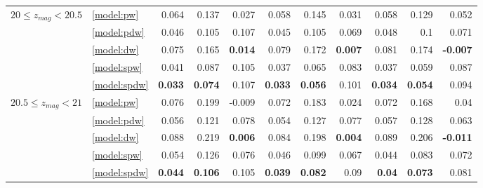 \documentclass[fleqn,usenatbib]{mnras}
\begin{document}
\begin{table}
\begin{tabular}{llrrrrrrrrr}
\hline
            $20 \leq z_{mag} < 20.5$ & \ref{model:pw} &                0.064 &           0.137 &            0.027 &            0.058 &           0.145 &            0.031 &            0.058 &           0.129 &            0.052 \\
                                   & \ref{model:pdw} &                0.046 &           0.105 &            0.107 &            0.045 &           0.105 &            0.069 &            0.048 &             0.1 &            0.071 \\
                                   & \ref{model:dw} &                0.075 &           0.165 &   \textbf{0.014} &            0.079 &           0.172 &   \textbf{0.007} &            0.081 &           0.174 &  \textbf{-0.007} \\
                                   & \ref{model:spw} &                0.041 &           0.087 &            0.105 &            0.037 &           0.065 &            0.083 &            0.037 &           0.059 &            0.087 \\
                                   & \ref{model:spdw} &       \textbf{0.033} &  \textbf{0.074} &            0.107 &   \textbf{0.033} &  \textbf{0.056} &            0.101 &   \textbf{0.034} &  \textbf{0.054} &            0.094 \\
\hline
            $20.5 \leq z_{mag} < 21$ & \ref{model:pw} &                0.076 &           0.199 &           -0.009 &            0.072 &           0.183 &            0.024 &            0.072 &           0.168 &             0.04 \\
                                   & \ref{model:pdw} &                0.056 &           0.121 &            0.078 &            0.054 &           0.127 &            0.077 &            0.057 &           0.128 &            0.063 \\
                                   & \ref{model:dw} &                0.088 &           0.219 &   \textbf{0.006} &            0.084 &           0.198 &   \textbf{0.004} &            0.089 &           0.206 &  \textbf{-0.011} \\
                                   & \ref{model:spw} &                0.054 &           0.126 &            0.076 &            0.046 &           0.099 &            0.067 &            0.044 &           0.083 &            0.072 \\
                                   & \ref{model:spdw} &       \textbf{0.044} &  \textbf{0.106} &            0.105 &   \textbf{0.039} &  \textbf{0.082} &             0.09 &    \textbf{0.04} &  \textbf{0.073} &            0.081 \\

\end{tabular}
\end{table}
\end{document}

